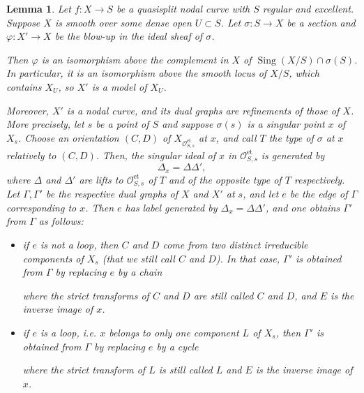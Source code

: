 \documentclass[a4paper,12pt]{amsart} %
\numberwithin{equation}{subsection}
\newcommand{\on}[1]{\operatorname{#1}}
\def\Sing{\operatorname{Sing}}
\theoremstyle{definition}
\theoremstyle{plain}%
\newtheorem{lemma}[definition]{Lemma}
\theoremstyle{remark}
\renewcommand{\phi}{\varphi}
\renewcommand{\O}{\mathcal{O}}
\begin{document}
\begin{lemma}\label{structure des (C,delta)-blowups}
Let $f:X\to S$ be a quasisplit nodal curve with $S$ regular and excellent. Suppose $X$ is smooth over some dense open $U\subset S$. Let $\sigma\colon S\to X$ be a section and $\phi\colon X'\to X$ be the blow-up in the ideal sheaf of $\sigma$.

Then $\phi$ is an isomorphism above the complement in $X$ of $\Sing(X/S)\cap\sigma(S)$. In particular, it is an isomorphism above the smooth locus of $X/S$, which contains $X_U$, so $X'$ is a model of $X_U$. 

Moreover, $X'$ is a nodal curve, and its dual graphs are refinements of those of $X$. More precisely, let $s$ be a point of $S$ and suppose $\sigma(s)$ is a singular point $x$ of $X_s$. Choose an orientation $(C,D)$ of $X_{\O_{S,s}^{\on{et}}}$ at $x$, and call $T$ the type of $\sigma$ at $x$ relatively to $(C,D)$. Then, the singular ideal of $x$ in $\O_{S,s}^{\on{et}}$ is generated by
\[
\Delta_x=\Delta\Delta',
\]
where $\Delta$ and $\Delta'$ are lifts to $\O_{S,s}^{\on{et}}$ of $T$ and of the opposite type of $T$ respectively. Let $\Gamma,\Gamma'$ be the respective dual graphs of $X$ and $X'$ at $s$, and let $e$ be the edge of $\Gamma$ corresponding to $x$. Then $e$ has label generated by $\Delta_x=\Delta\Delta'$, and one obtains $\Gamma'$ from $\Gamma$ as follows:

\begin{itemize}
\item if $e$ is not a loop, then $C$ and $D$ come from two distinct irreducible components of $X_s$ (that we still call $C$ and $D$). In that case, $\Gamma'$ is obtained from $\Gamma$ by replacing $e$ by a chain

\begin{center}
\end{center}

where the strict transforms of $C$ and $D$ are still called $C$ and $D$, and $E$ is the inverse image of $x$.

\item if $e$ is a loop, i.e. $x$ belongs to only one component $L$ of $X_s$, then $\Gamma'$ is obtained from $\Gamma$ by replacing $e$ by a cycle

\begin{center}
\end{center}

where the strict transform of $L$ is still called $L$ and $E$ is the inverse image of $x$.

\end{itemize}


\end{lemma}
\end{document}
